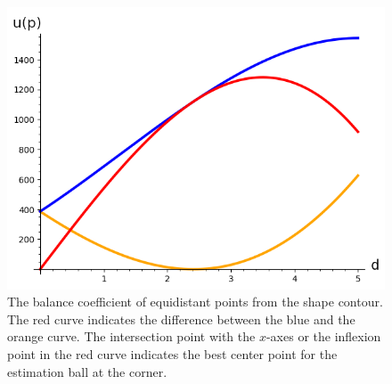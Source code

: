 \begin{figure}
\begin{minipage}{0.25\textwidth}
\end{minipage}%
\begin{minipage}{0.75\textwidth}
\includegraphics[scale=0.75]{figures/chapter7/balance-coefficient-p2-with-sum.png}
\end{minipage}
\caption{The balance coefficient of equidistant points from the shape contour. The red curve indicates the difference between the blue and the orange curve. The intersection point with the $x$-axes or the inflexion point in the red curve indicates the best center point for the estimation ball at the corner. }
\label{fig:balance-plot}
\end{figure}


